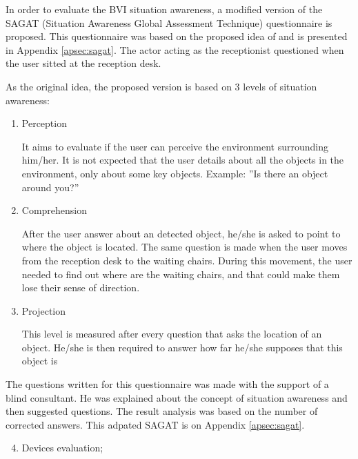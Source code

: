         In order to evaluate the BVI situation awareness, a modified version of the SAGAT (Situation Awareness Global Assessment Technique) questionnaire is proposed. This questionnaire was based on the proposed idea of  and is presented in Appendix \ref{apsec:sagat}. The actor acting as the receptionist questioned when the user sitted at the reception desk. 

        As the original idea, the proposed version is based on 3 levels of situation awareness:

        \begin{enumerate}[leftmargin = 6em, label = Level \arabic* -- ]
            \item Perception
            
            It aims to evaluate if the user can perceive the environment surrounding him/her. It is not expected that the user details about all the objects in the environment, only about some key objects. Example: ”Is there an object around you?”

            \item Comprehension
    
            After the user answer about an detected object, he/she is asked to point to where the object is located. The same question is made when the user moves from the reception desk to the waiting chairs. During this movement, the user needed to find out where are the waiting chairs, and that could make them lose their sense of direction.
    
            \item Projection
            
            This level is measured after every question that asks the location of an object. He/she is then required to answer how far he/she supposes that this object is
            
        \end{enumerate}      

        The questions written for this questionnaire was made with the support of a blind consultant. He was explained about the concept of situation awareness and then suggested questions. The result analysis was based on the number of corrected answers. This adpated SAGAT is on Appendix \ref{apsec:sagat}.

        \begin{enumerate} [label = \Alph*)]
            \setcounter{enumi}{3}
            \item Devices evaluation;
        \end{enumerate}

